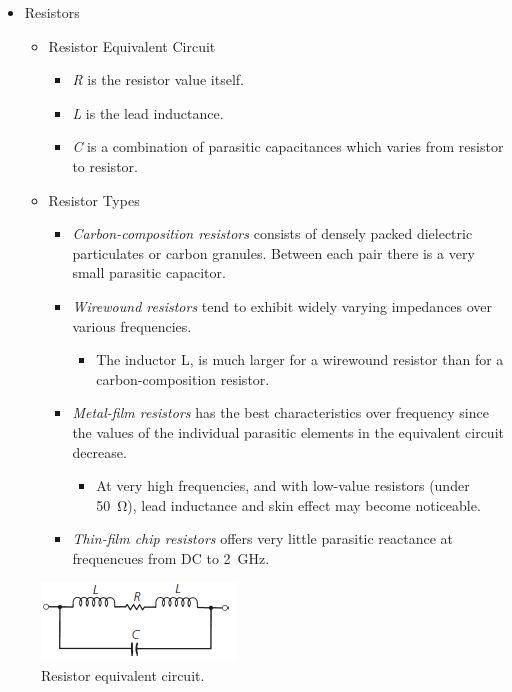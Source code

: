 \begin{itemize}
	\item Resistors
	\begin{itemize}
		\item Resistor Equivalent Circuit
		\begin{itemize}
			\item \textit{R} is the resistor value itself.
			\item \textit{L} is the lead inductance.
			\item \textit{C} is a combination of parasitic capacitances
			which varies from resistor to resistor.
		\end{itemize}
		\item Resistor Types
		\begin{itemize}
			\item \textit{Carbon-composition resistors} consists of densely packed dielectric particulates or carbon granules.
			Between each pair there is a very small parasitic capacitor.
			\item \textit{Wirewound resistors} tend to exhibit widely varying
			impedances over various frequencies. 
			\begin{itemize}
				\item The inductor L, is much larger for a wirewound resistor than for a carbon-composition resistor.
			\end{itemize}
			\item \textit{Metal-film resistors} has the best characteristics
			over frequency since the values of the	individual parasitic elements in the equivalent circuit decrease.
			\begin{itemize}
				\item At very high frequencies, and with low-value resistors (under \SI{50}{\ohm}), lead	inductance and skin effect may become noticeable.
			\end{itemize}
			\item \textit{Thin-film chip resistors} offers very little parasitic reactance at frequencues from DC to \SI{2}{\giga\hertz}.
		\end{itemize}
	\end{itemize}
\end{itemize}

\begin{figure} [H]
	\centering
	\includegraphics[width=0.4\linewidth]{graphics/15.png}
	\caption{Resistor equivalent circuit.}
	\label{fig:15}
\end{figure}

